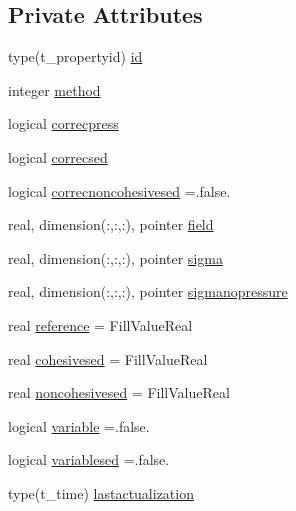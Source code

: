 \subsection*{Private Attributes}
\begin{DoxyCompactItemize}
\item 
type(t\+\_\+propertyid) \mbox{\hyperlink{structmodulewaterproperties_1_1t__density_a81a00429564938d4f64f9b8e0034719e}{id}}
\item 
integer \mbox{\hyperlink{structmodulewaterproperties_1_1t__density_a30bb747fabd50762531e36be03247d08}{method}}
\item 
logical \mbox{\hyperlink{structmodulewaterproperties_1_1t__density_ad3e7020c13ed409d1fc1dbe341481712}{correcpress}}
\item 
logical \mbox{\hyperlink{structmodulewaterproperties_1_1t__density_a2850f1c058521b112d9e7a2fe3ad424d}{correcsed}}
\item 
logical \mbox{\hyperlink{structmodulewaterproperties_1_1t__density_ad8bc99167e886cc28e8238ff65d5b973}{correcnoncohesivesed}} =.false.
\item 
real, dimension(\+:,\+:,\+:), pointer \mbox{\hyperlink{structmodulewaterproperties_1_1t__density_ad5fcf88c2d8272a562bf02f62d2fb77b}{field}}
\item 
real, dimension(\+:,\+:,\+:), pointer \mbox{\hyperlink{structmodulewaterproperties_1_1t__density_a5095d797f1526ccec09b60901d0f2726}{sigma}}
\item 
real, dimension(\+:,\+:,\+:), pointer \mbox{\hyperlink{structmodulewaterproperties_1_1t__density_ada77f438d48b3c0750257b3a1ba51fd6}{sigmanopressure}}
\item 
real \mbox{\hyperlink{structmodulewaterproperties_1_1t__density_a6f8e9d48dca465b07586d4edbe1b4605}{reference}} = Fill\+Value\+Real
\item 
real \mbox{\hyperlink{structmodulewaterproperties_1_1t__density_aca11ccd3a3b81087ed3dcf6a43af0eb4}{cohesivesed}} = Fill\+Value\+Real
\item 
real \mbox{\hyperlink{structmodulewaterproperties_1_1t__density_a3859f4c9519c58efb05a05adaa63b0e7}{noncohesivesed}} = Fill\+Value\+Real
\item 
logical \mbox{\hyperlink{structmodulewaterproperties_1_1t__density_ac7a9c95d1c6c975b871b1bb3f17a4fb4}{variable}} =.false.
\item 
logical \mbox{\hyperlink{structmodulewaterproperties_1_1t__density_ad6361ba06b3fefecd4cd790c6630a337}{variablesed}} =.false.
\item 
type(t\+\_\+time) \mbox{\hyperlink{structmodulewaterproperties_1_1t__density_a4d7795a0410e4d1341fb64ed467cd585}{lastactualization}}
\end{DoxyCompactItemize}


